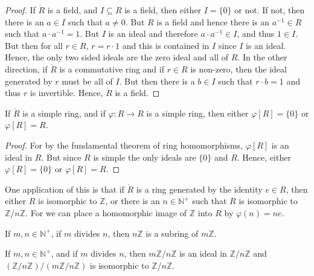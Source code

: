 \documentclass{article}                                                        %
\begin{document}
                \begin{proof}
                    If $\ring{R}$ is a field, and $I\subseteq{R}$ is a field,
                    then either $I=\{0\}$ or not. If not, then there is an
                    $a\in{I}$ such that $a\ne{0}$. But $R$ is a field and hence
                    there is an $a^{\minus{1}}\in{R}$ such that
                    $a\cdot{a}^{\minus{1}}=1$. But $I$ is an ideal and therefore
                    $a\cdot{a}^{\minus{1}}\in{I}$, and thus $1\in{I}$. But then
                    for all $r\in{R}$, $r=r\cdot{1}$ and this is contained in
                    $I$ since $I$ is an ideal. Hence, the only two sided ideals
                    are the zero ideal and all of $R$. In the other direction,
                    if $\ring{R}$ is a commutative ring and if $r\in{R}$ is
                    non-zero, then the ideal generated by $r$ must be all of
                    $I$. But then there is a $b\in{I}$ such that $r\cdot{b}=1$
                    and thus $r$ is invertible. Hence, $\ring{R}$ is a field.
                \end{proof}
                \begin{theorem}
                    If $\ring{R}$ is a simple ring, and if
                    $\varphi:R\rightarrow{R}$ is a simple ring, then either
                    $\varphi[R]=\{0\}$ or $\varphi[R]=R$.
                \end{theorem}
                \begin{proof}
                    For by the fundamental theorem of ring homomorphisms,
                    $\varphi[R]$ is an ideal in $R$. But since $R$ is simple
                    the only ideals are $\{0\}$ and $R$. Hence, either
                    $\varphi[R]=\{0\}$ or $\varphi[R]=R$.
                \end{proof}
                One application of this is that if $\ring{R}$ is a ring
                generated by the identity $e\in{R}$, then either $R$ is
                isomorphic to $\mathbb{Z}$, or there is an $n\in\mathbb{N}^{+}$
                such that $R$ is isomorphic to $\mathbb{Z}/n\mathbb{Z}$. For we
                can place a homomorphic image of $\mathbb{Z}$ into $R$ by
                $\varphi(n)=ne$.
                \begin{theorem}
                    If $m,n\in\mathbb{N}^{+}$, if $m$ divides $n$, then
                    $n\mathbb{Z}$ is a subring of $m\mathbb{Z}$.
                \end{theorem}
                \begin{theorem}
                    If $m,n\in\mathbb{N}^{+}$, and if $m$ divides $n$, then
                    $m\mathbb{Z}/n\mathbb{Z}$ is an ideal in
                    $\mathbb{Z}/n\mathbb{Z}$ and
                    $(\mathbb{Z}/n\mathbb{Z})/(m\mathbb{Z}/n\mathbb{Z})$ is
                    isomorphic to $\mathbb{Z}/n\mathbb{Z}$.
                \end{theorem}
\end{document}
